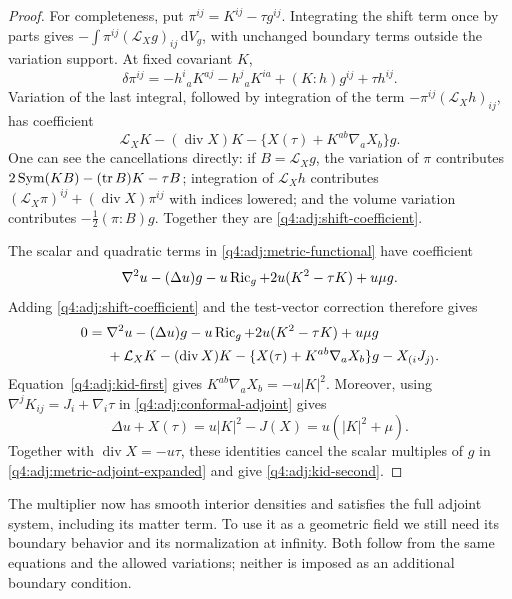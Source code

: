 \begin{proof}
For completeness, put $\pi^{ij}=K^{ij}-\tau g^{ij}$.  Integrating the shift
term once by parts gives
$-\int\pi^{ij}(\mathcal L_Xg)_{ij}\,\mathrm dV_g$, with unchanged boundary
terms outside the variation support.  At fixed covariant $K$,
\[
 \delta\pi^{ij}
 =-h^i{}_aK^{aj}-h^j{}_aK^{ia}
   +(K:h)g^{ij}+\tau h^{ij}.
\]
Variation of the last integral, followed by integration of the term
$-\pi^{ij}(\mathcal L_Xh)_{ij}$, has coefficient
\begin{equation}
 \mathcal L_XK-(\operatorname{div}X)K
  -\{X(\tau)+K^{ab}\nabla_aX_b\}g.
 \label{q4:adj:shift-coefficient}
\end{equation}
One can see the cancellations directly: if $B=\mathcal L_Xg$, the variation
of $\pi$ contributes
$2\operatorname{Sym}(KB)-(\operatorname{tr} B)K-\tau B$; integration of $\mathcal L_Xh$ contributes
$(\mathcal L_X\pi)^{ij}+(\operatorname{div}X)\pi^{ij}$ with indices lowered;
and the volume variation contributes $-\tfrac12(\pi:B)g$.
Together they are \eqref{q4:adj:shift-coefficient}.

The scalar and quadratic terms in \eqref{q4:adj:metric-functional} have
coefficient
\[
 \nabla^2u-(\Delta u)g-u\operatorname{Ric}_g
       +2u(K^2-\tau K)+u\mu g.
\]
Adding \eqref{q4:adj:shift-coefficient} and the test-vector correction therefore
gives
\begin{align}
 0={}&\nabla^2u-(\Delta u)g-u\operatorname{Ric}_g+2u(K^2-\tau K)+u\mu g
       \notag\\
    &+\mathcal L_XK-(\operatorname{div}X)K
      -\{X(\tau)+K^{ab}\nabla_aX_b\}g-X_{(i}J_{j)}.
 \label{q4:adj:metric-adjoint-expanded}
\end{align}
Equation~\eqref{q4:adj:kid-first} gives
$K^{ab}\nabla_aX_b=-u|K|^2$.  Moreover, using
$\nabla^jK_{ij}=J_i+\nabla_i\tau$ in
\eqref{q4:adj:conformal-adjoint} gives
\begin{equation}
 \Delta u+X(\tau)
   =u|K|^2-J(X)=u(|K|^2+\mu).
 \label{q4:adj:trace-identity}
\end{equation}
Together with $\operatorname{div}X=-u\tau$, these identities cancel the scalar
multiples of $g$ in \eqref{q4:adj:metric-adjoint-expanded} and give
\eqref{q4:adj:kid-second}.
\end{proof}

The multiplier now has smooth interior densities and satisfies the
full adjoint system, including its matter term. To use it as a geometric
field we still need its boundary behavior and its normalization at
infinity. Both follow from the same equations and the allowed variations;
neither is imposed as an additional boundary condition.

